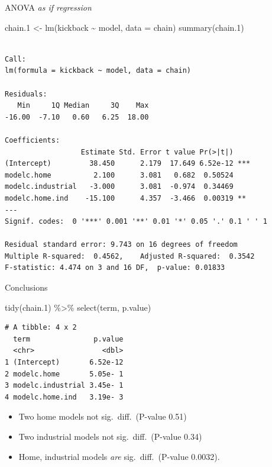 \documentclass[
  ignorenonframetext,
]{beamer}
\newenvironment{Shaded}{\begin{snugshade}}{\end{snugshade}}
\newcommand{\AttributeTok}[1]{\textcolor[rgb]{0.40,0.45,0.13}{#1}}
\newcommand{\FloatTok}[1]{\textcolor[rgb]{0.68,0.00,0.00}{#1}}
\newcommand{\FunctionTok}[1]{\textcolor[rgb]{0.28,0.35,0.67}{#1}}
\newcommand{\NormalTok}[1]{\textcolor[rgb]{0.00,0.23,0.31}{#1}}
\newcommand{\OtherTok}[1]{\textcolor[rgb]{0.00,0.23,0.31}{#1}}
\newcommand{\SpecialCharTok}[1]{\textcolor[rgb]{0.37,0.37,0.37}{#1}}
\begin{document}
\begin{frame}[fragile]{ANOVA \emph{as if regression}}
\protect\hypertarget{anova-as-if-regression}{}
\scriptsize

\begin{Shaded}
\begin{Highlighting}[]
\NormalTok{chain}\FloatTok{.1} \OtherTok{\textless{}{-}} \FunctionTok{lm}\NormalTok{(kickback }\SpecialCharTok{\textasciitilde{}}\NormalTok{ model, }\AttributeTok{data =}\NormalTok{ chain)}
\FunctionTok{summary}\NormalTok{(chain}\FloatTok{.1}\NormalTok{)}
\end{Highlighting}
\end{Shaded}

\begin{verbatim}

Call:
lm(formula = kickback ~ model, data = chain)

Residuals:
   Min     1Q Median     3Q    Max 
-16.00  -7.10   0.60   6.25  18.00 

Coefficients:
                  Estimate Std. Error t value Pr(>|t|)    
(Intercept)         38.450      2.179  17.649 6.52e-12 ***
modelc.home          2.100      3.081   0.682  0.50524    
modelc.industrial   -3.000      3.081  -0.974  0.34469    
modelc.home.ind    -15.100      4.357  -3.466  0.00319 ** 
---
Signif. codes:  0 '***' 0.001 '**' 0.01 '*' 0.05 '.' 0.1 ' ' 1

Residual standard error: 9.743 on 16 degrees of freedom
Multiple R-squared:  0.4562,    Adjusted R-squared:  0.3542 
F-statistic: 4.474 on 3 and 16 DF,  p-value: 0.01833
\end{verbatim}

\normalsize
\end{frame}

\begin{frame}[fragile]{Conclusions}
\protect\hypertarget{conclusions}{}
\begin{Shaded}
\begin{Highlighting}[]
\FunctionTok{tidy}\NormalTok{(chain}\FloatTok{.1}\NormalTok{) }\SpecialCharTok{\%\textgreater{}\%} \FunctionTok{select}\NormalTok{(term, p.value)}
\end{Highlighting}
\end{Shaded}

\begin{verbatim}
# A tibble: 4 x 2
  term               p.value
  <chr>                <dbl>
1 (Intercept)       6.52e-12
2 modelc.home       5.05e- 1
3 modelc.industrial 3.45e- 1
4 modelc.home.ind   3.19e- 3
\end{verbatim}

\begin{itemize}
\item
  Two home models not sig.~diff.~(P-value 0.51)
\item
  Two industrial models not sig.~diff.~(P-value 0.34)
\item
  Home, industrial models \emph{are} sig.~diff.~(P-value 0.0032).
\end{itemize}
\end{frame}
\end{document}
